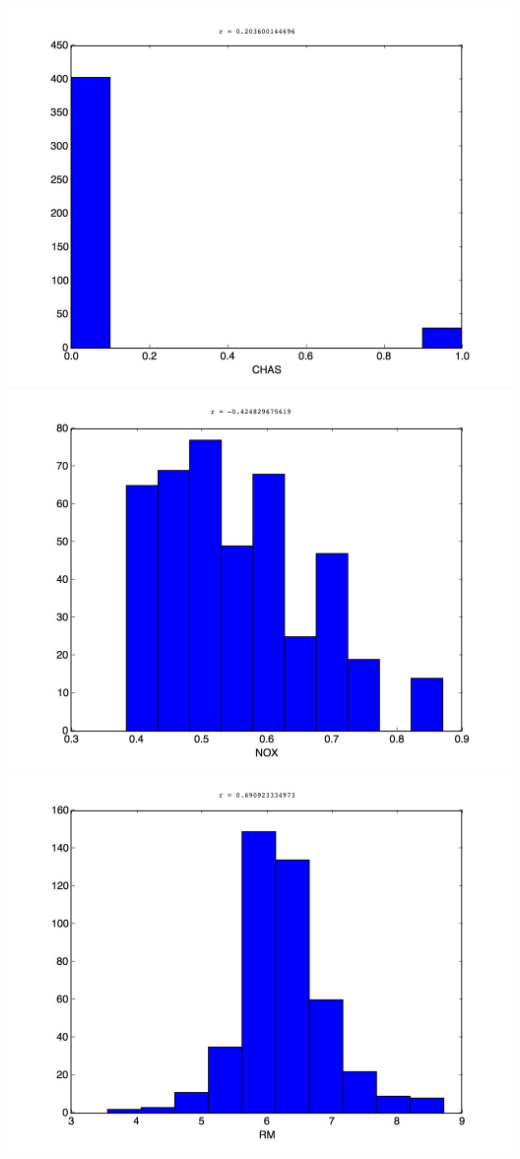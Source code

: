 \documentclass[]{report}
\begin{document}
\begin{center}
			\includegraphics[scale=0.2]{hist_3}\\
			\includegraphics[scale=0.2]{hist_4}\\
			\includegraphics[scale=0.2]{hist_5}\\

\end{center}
\end{document}
